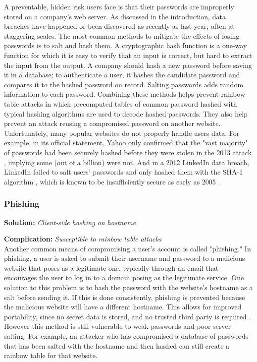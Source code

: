 A preventable, hidden risk users face is that their passwords are improperly stored on a company's web server. As discussed in the introduction, data breaches have happened or been discovered as recently as last year, often at staggering scales. The most common methods to mitigate the effects of losing passwords is to salt and hash them. A cryptographic hash function is a one-way function for which it is easy to verify that an input is correct, but hard to extract the input from the output. A company should hash a new password before saving it in a database; to authenticate a user, it hashes the candidate password and compares it to the hashed password on record. Salting passwords adds random information to each password. Combining these methods helps prevent rainbow table attacks in which precomputed tables of common password hashed with typical hashing algorithms are used to decode hashed passwords. They also help prevent an attack reusing a compromised password on another website. Unfortunately, many popular websites do not properly handle users data. For example, in its official statement, Yahoo only confirmed that the "vast majority" of passwords had been securely hashed before they were stolen in the 2013 attack \cite{Lord:2016}, implying some (out of a billion) were not. And in a 2012 LinkedIn data breach, LinkedIn failed to salt users' passwords and only hashed them with the SHA-1 algorithm \cite{Perlroth:2012, Hackett:2016}, which is known to be insufficiently secure as early as 2005 \cite{Wang:2005}.


\subsubsection{Phishing}

\textbf{Solution:} \emph{Client-side hashing on hostname}

\noindent\textbf{Complication:} \emph{Susceptible to rainbow table attacks}\\

Another common means of compromising a user's account is called "phishing." In phishing, a user is asked to submit their username and password to a malicious website that poses as a legitimate one, typically through an email that encourages the user to log in to a domain posing as the legitimate service. One solution to this problem is to hash the password with the website's hostname as a salt before sending it. If this is done consistently, phishing is prevented because the malicious website will have a different hostname. This allows for improved portability, since no secret data is stored, and no trusted third party is required \cite{Halderman:2005}. However this method is still vulnerable to weak passwords and poor server salting. For example, an attacker who has compromised a database of passwords that has been salted with the hostname and then hashed can still create a rainbow table for that website.


